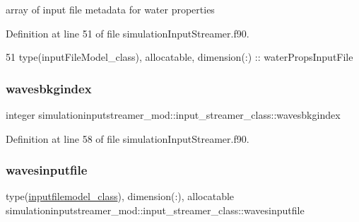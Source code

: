 array of input file metadata for water properties 



Definition at line 51 of file simulation\+Input\+Streamer.\+f90.


\begin{DoxyCode}
51         \textcolor{keywordtype}{type}(inputFileModel\_class), \textcolor{keywordtype}{allocatable}, \textcolor{keywordtype}{dimension(:)} :: waterPropsInputFile
\end{DoxyCode}
\mbox{\label{structsimulationinputstreamer__mod_1_1input__streamer__class_a0eeac60df733bf08af360334b8143536}} 
\subsubsection{\texorpdfstring{wavesbkgindex}{wavesbkgindex}}
{\footnotesize\ttfamily integer simulationinputstreamer\+\_\+mod\+::input\+\_\+streamer\+\_\+class\+::wavesbkgindex\hspace{0.3cm}{\ttfamily [private]}}



Definition at line 58 of file simulation\+Input\+Streamer.\+f90.

\mbox{\label{structsimulationinputstreamer__mod_1_1input__streamer__class_afaf4ae68e00fdca31e5c59dadd94e05d}} 
\subsubsection{\texorpdfstring{wavesinputfile}{wavesinputfile}}
{\footnotesize\ttfamily type(\mbox{\hyperlink{structsimulationinputstreamer__mod_1_1inputfilemodel__class}{inputfilemodel\+\_\+class}}), dimension(\+:), allocatable simulationinputstreamer\+\_\+mod\+::input\+\_\+streamer\+\_\+class\+::wavesinputfile\hspace{0.3cm}{\ttfamily [private]}}



